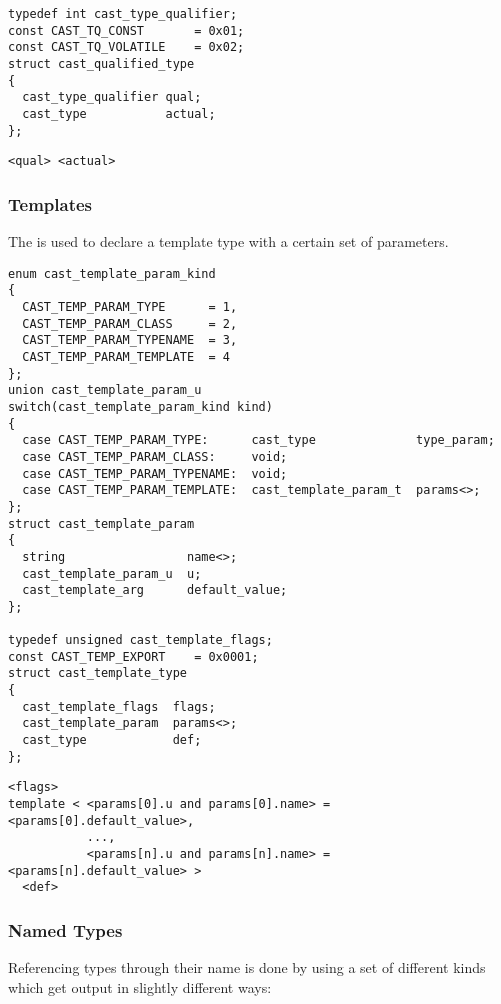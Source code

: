 \begin{verbatim}
typedef int cast_type_qualifier;
const CAST_TQ_CONST       = 0x01;
const CAST_TQ_VOLATILE    = 0x02;
struct cast_qualified_type
{
  cast_type_qualifier qual;
  cast_type           actual;
};
\end{verbatim}

\begin{verbatim}
<qual> <actual>
\end{verbatim}

\subsubsection{Templates}

The  is used to declare a template type with a
certain set of parameters.

\begin{verbatim}
enum cast_template_param_kind
{
  CAST_TEMP_PARAM_TYPE      = 1,
  CAST_TEMP_PARAM_CLASS     = 2,
  CAST_TEMP_PARAM_TYPENAME  = 3,
  CAST_TEMP_PARAM_TEMPLATE  = 4
};
union cast_template_param_u
switch(cast_template_param_kind kind)
{
  case CAST_TEMP_PARAM_TYPE:      cast_type              type_param;
  case CAST_TEMP_PARAM_CLASS:     void;
  case CAST_TEMP_PARAM_TYPENAME:  void;
  case CAST_TEMP_PARAM_TEMPLATE:  cast_template_param_t  params<>;
};
struct cast_template_param
{
  string                 name<>;
  cast_template_param_u  u;
  cast_template_arg      default_value;
};

typedef unsigned cast_template_flags;
const CAST_TEMP_EXPORT    = 0x0001;
struct cast_template_type
{
  cast_template_flags  flags;
  cast_template_param  params<>;
  cast_type            def;
};
\end{verbatim}

\begin{verbatim}
<flags>
template < <params[0].u and params[0].name> = <params[0].default_value>,
           ...,
           <params[n].u and params[n].name> = <params[n].default_value> >
  <def>
\end{verbatim}

\subsubsection{Named Types}

Referencing types through their name is done by using a set of different kinds
which get output in slightly different ways:

